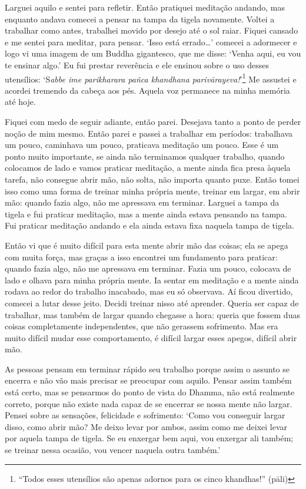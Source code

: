Larguei aquilo e sentei para refletir. Então pratiquei meditação
andando, mas enquanto andava comecei a pensar na tampa da tigela
novamente. Voltei a trabalhar como antes, trabalhei movido por desejo
até o sol raiar. Fiquei cansado e me sentei para meditar, para pensar.
`Isso está errado\ldots{}' comecei a adormecer e logo vi uma imagem de
um Buddha gigantesco, que me disse: `Venha aqui, eu vou te ensinar
algo.' Eu fui prestar reverência e ele ensinou sobre o uso desses
utensílios: `S\emph{abbe ime parikharara pañca khandhana
parivārayeva!}'\footnote{``Todos esses utensílios são apenas adornos para
  os cinco khandhas!'' (pāli)} Me assustei e acordei tremendo da cabeça
aos pés. Aquela voz permanece na minha memória até hoje.

Fiquei com medo de seguir adiante, então parei. Desejava tanto a ponto
de perder noção de mim mesmo. Então parei e passei a trabalhar em
períodos: trabalhava um pouco, caminhava um pouco, praticava meditação
um pouco. Esse é um ponto muito importante, se ainda não terminamos
qualquer trabalho, quando colocamos de lado e vamos praticar meditação,
a mente ainda fica presa àquela tarefa, não consegue abrir mão, não
solta, não importa quanto puxe. Então tomei isso como uma forma de
treinar minha própria mente, treinar em largar, em abrir mão: quando
fazia algo, não me apressava em terminar. Larguei a tampa da tigela e
fui praticar meditação, mas a mente ainda estava pensando na tampa. Fui
praticar meditação andando e ela ainda estava fixa naquela tampa de
tigela.

Então vi que é muito difícil para esta mente abrir mão das coisas; ela
se apega com muita força, mas graças a isso encontrei um fundamento para
praticar: quando fazia algo, não me apressava em terminar. Fazia um
pouco, colocava de lado e olhava para minha própria mente. Ia sentar em
meditação e a mente ainda rodava ao redor do trabalho inacabado, mas eu
só observava. Aí ficou divertido, comecei a lutar desse jeito. Decidi
treinar nisso até aprender. Queria ser capaz de trabalhar, mas também de
largar quando chegasse a hora: queria que fossem duas coisas
completamente independentes, que não gerassem sofrimento. Mas era muito
difícil mudar esse comportamento, é difícil largar esses apegos, difícil
abrir mão.

As pessoas pensam em terminar rápido seu trabalho porque assim o assunto
se encerra e não vão mais precisar se preocupar com aquilo. Pensar assim
também está certo, mas se pensarmos do ponto de vista do Dhamma, não
está realmente correto, porque não existe nada capaz de se encerrar se
nossa mente não largar. Pensei sobre as sensações, felicidade e
sofrimento: `Como vou conseguir largar disso, como abrir mão? Me deixo
levar por ambos, assim como me deixei levar por aquela tampa de tigela.
Se eu enxergar bem aqui, vou enxergar ali também; se treinar nessa
ocasião, vou vencer naquela outra também.'

